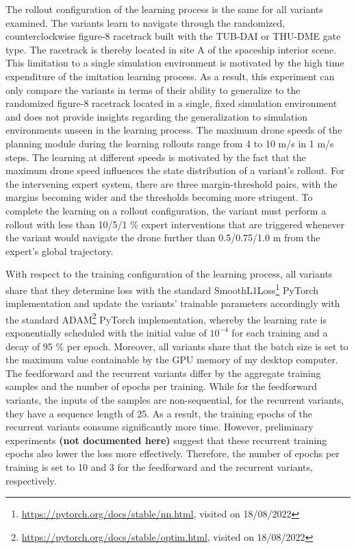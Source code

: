 The rollout configuration of the learning process
is the same for all variants examined.
The variants learn to navigate through 
the randomized, counterclockwise figure-8 racetrack
built with the TUB-DAI or THU-DME gate type.
The racetrack is thereby located in
site A of the spaceship interior scene.
This limitation to a single simulation environment
is motivated by the 
high time expenditure of the imitation learning process.
As a result,
this experiment can only compare the variants 
in terms of their ability to generalize 
to the randomized figure-8 racetrack
located in a single, fixed simulation environment
and does not provide insights 
regarding the generalization to simulation environments 
unseen in the learning process.
The maximum drone speeds of the planning module
during the learning rollouts
range from 4 to 10 m/s in 1 m/s steps.
The learning at different speeds is motivated
by the fact that the maximum drone speed 
influences the state distribution of a variant's rollout.
For the intervening expert system, 
there are three margin-threshold pairs, 
with the margins becoming wider 
and the thresholds becoming more stringent.
To complete the learning on a rollout configuration,
the variant must perform a rollout 
with less than 10/5/1 \% expert interventions
that are triggered whenever the variant
would navigate the drone further than 0.5/0.75/1.0 m
from the expert's global trajectory.

With respect to the training configuration of the learning process,
all variants share that they 
determine loss with
the standard 
SmoothL1Loss\footnote{\url{https://pytorch.org/docs/stable/nn.html}, visited on 18/08/2022}
PyTorch implementation
and update the variants' trainable parameters accordingly 
with the standard 
ADAM\footnote{\url{https://pytorch.org/docs/stable/optim.html}, visited on 18/08/2022}
PyTorch implementation,
whereby the learning rate is exponentially scheduled
with the initial value of $10^{-4}$ for each training and a decay of 
95 \% per epoch.
Moreover, all variants share that the batch size 
is set to the maximum value containable by
the GPU memory of my desktop computer.
The feedforward and the recurrent variants differ 
by the aggregate training samples
and the number of epochs per training.
While for the feedforward variants,
the inputs of the samples are non-sequential,
for the recurrent variants,
they have a sequence length of 25.
As a result, the training epochs of the
recurrent variants consume significantly more time.
However, preliminary experiments 
\textbf{(not documented here)}
suggest that these recurrent training epochs 
also lower the loss more effectively.
Therefore, the number of epochs per training
is set to 10 and 3 for the feedforward
and the recurrent variants, respectively.

